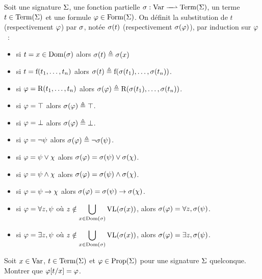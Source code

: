 \begin{definition}
    Soit une signature $\Sigma$, une fonction partielle
    $\makeFunNamePartial{\subSimul}{\Var}{\Term(\Sign)}$, un terme
    $t \in \operatorname{Term}(\Sigma)$ et  une formule $\varphi \in \operatorname{Form}(\Sigma)$. On
    définit la substitution de $t$ (respectivement $\varphi$) par $\sigma$,
    notée $\sigma(t)$ (respectivement $\sigma(\varphi)$), par induction
    sur $\varphi$~:
    \begin{itemize}
    \item si $t = x \in \operatorname{Dom}(\sigma)$ alors
      $\sigma(t) \triangleq \sigma(x)$
    \item si $t = \mathrm{f}(t_1,\ldots,t_n)$ alors
      $\sigma(t) \triangleq \mathrm{f}(\sigma(t_1),\ldots,\sigma(t_n))$.
    \item si $\varphi = \mathrm{R}(t_1,\ldots,t_n)$ alors
      $\sigma(\varphi)\triangleq\mathrm{R}(\sigma(t_1),\ldots,\sigma(t_n))$.
    \item si $\varphi = \top$ alors $\sigma(\varphi) \triangleq \top$.
    \item si $\varphi = \bot$ alors $\sigma(\varphi) \triangleq \bot$.
    \item si $\varphi = \lnot \psi$ alors
      $\sigma(\varphi) \triangleq \lnot \sigma(\psi)$.
    \item si $\varphi = \psi \lor \chi$ alors
      $\sigma(\varphi) = \sigma(\psi)\lor\sigma(\chi)$.
    \item si $\varphi = \psi \land \chi$ alors
      $\sigma(\varphi) = \sigma(\psi)\land\sigma(\chi)$.
    \item si $\varphi = \psi \to \chi$ alors
      $\sigma(\varphi) = \sigma(\psi)\to\sigma(\chi)$.
    \item si $\varphi = \forall z, \psi$ où
      $\displaystyle z \notin \bigcup_{x \in \operatorname{Dom}(\sigma)}\operatorname{VL}(\sigma(x))$,
      alors $\sigma(\varphi) = \forall z, \sigma(\psi)$.
    \item si $\varphi = \exists z, \psi$ où
      $\displaystyle z \notin \bigcup_{x \in \operatorname{Dom}(\sigma)}\operatorname{VL}(\sigma(x))$,
      alors $\sigma(\varphi) = \exists z, \sigma(\psi)$.
    \end{itemize}
\end{definition}

\begin{exercise}
  Soit $x\in \operatorname{Var}$, $t\in\operatorname{Term}(\Sigma)$ et $\varphi\in\operatorname{Prop}(\Sigma)$ pour une
  signature $\Sigma$ quelconque. Montrer que $\varphi[t/x] = \varphi$.
\end{exercise}

